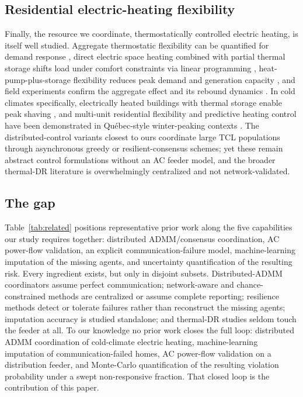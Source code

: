 \subsection{Residential electric-heating flexibility}
Finally, the resource we coordinate, thermostatically controlled electric
heating, is itself well studied. Aggregate thermostatic flexibility can be
quantified for demand response \cite{Gasca2022}, direct electric space heating
combined with partial thermal storage shifts load under comfort constraints via
linear programming \cite{Ali2014}, heat-pump-plus-storage flexibility reduces
peak demand and generation capacity \cite{Baeten2017}, and field experiments
confirm the aggregate effect and its rebound dynamics \cite{Lakshmanan2016}. In
cold climates specifically, electrically heated buildings with thermal storage
enable peak shaving \cite{Guzman2015}, and multi-unit residential flexibility and
predictive heating control have been demonstrated in Qu\'ebec-style winter-peaking
contexts \cite{Nagarsheth2024,Toquica2022}. The distributed-control variants
closest to ours coordinate large TCL populations through asynchronous greedy
\cite{Kaheni2023} or resilient-consensus \cite{Liu2026} schemes; yet these
remain abstract control formulations without an AC feeder model, and the broader
thermal-DR literature is overwhelmingly centralized and not network-validated.

\subsection{The gap}
Table~\ref{tab:related} positions representative prior work along the five
capabilities our study requires together: distributed ADMM/consensus
coordination, AC power-flow validation, an explicit communication-failure model,
machine-learning imputation of the missing agents, and uncertainty
quantification of the resulting risk. Every ingredient exists, but only in
disjoint subsets. Distributed-ADMM coordinators assume perfect communication;
network-aware and chance-constrained methods are centralized or assume complete
reporting; resilience methods detect or tolerate failures rather than reconstruct
the missing agents; imputation accuracy is studied standalone; and thermal-DR
studies seldom touch the feeder at all. To our knowledge no prior work closes the
full loop: distributed ADMM coordination of cold-climate electric heating,
machine-learning imputation of communication-failed homes, AC power-flow
validation on a distribution feeder, and Monte-Carlo quantification of the
resulting violation probability under a swept non-responsive fraction. That
closed loop is the contribution of this paper.

